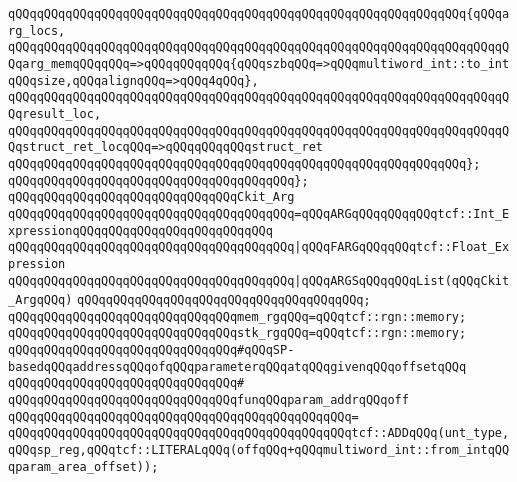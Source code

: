 \newline
\verb|qQQqqQQqqQQqqQQqqQQqqQQqqQQqqQQqqQQqqQQqqQQqqQQqqQQqqQQqqQQqqQQq{qQQqarg_locs,|\newline
\verb|qQQqqQQqqQQqqQQqqQQqqQQqqQQqqQQqqQQqqQQqqQQqqQQqqQQqqQQqqQQqqQQqqQQqqQQqarg_memqQQqqQQq=>qQQqqQQqqQQq{qQQqszbqQQq=>qQQqmultiword_int::to_intqQQqsize,qQQqalignqQQq=>qQQq4qQQq},|\newline
\newline
\verb|qQQqqQQqqQQqqQQqqQQqqQQqqQQqqQQqqQQqqQQqqQQqqQQqqQQqqQQqqQQqqQQqqQQqqQQqresult_loc,|\newline
\verb|qQQqqQQqqQQqqQQqqQQqqQQqqQQqqQQqqQQqqQQqqQQqqQQqqQQqqQQqqQQqqQQqqQQqqQQqstruct_ret_locqQQq=>qQQqqQQqqQQqstruct_ret|\newline
\verb|qQQqqQQqqQQqqQQqqQQqqQQqqQQqqQQqqQQqqQQqqQQqqQQqqQQqqQQqqQQqqQQq};|\newline
\verb|qQQqqQQqqQQqqQQqqQQqqQQqqQQqqQQqqQQqqQQq};|\newline
\newline
\verb|qQQqqQQqqQQqqQQqqQQqqQQqqQQqqQQqCkit_Arg|\newline
\verb|qQQqqQQqqQQqqQQqqQQqqQQqqQQqqQQqqQQqqQQq=qQQqARGqQQqqQQqqQQqtcf::Int_ExpressionqQQqqQQqqQQqqQQqqQQqqQQqqQQq|\newline
\verb|qQQqqQQqqQQqqQQqqQQqqQQqqQQqqQQqqQQqqQQq|\verb#|qQQqFARGqQQqqQQqtcf::Float_Expression#\newline
\verb|qQQqqQQqqQQqqQQqqQQqqQQqqQQqqQQqqQQqqQQq|\verb#|qQQqARGSqQQqqQQqList(qQQqCkit_ArgqQQq)#\newline
\verb|qQQqqQQqqQQqqQQqqQQqqQQqqQQqqQQqqQQqqQQq;|\newline
\newline
\verb|qQQqqQQqqQQqqQQqqQQqqQQqqQQqqQQqmem_rgqQQq=qQQqtcf::rgn::memory;|\newline
\verb|qQQqqQQqqQQqqQQqqQQqqQQqqQQqqQQqstk_rgqQQq=qQQqtcf::rgn::memory;|\newline
\newline
\verb|qQQqqQQqqQQqqQQqqQQqqQQqqQQqqQQq#qQQqSP-basedqQQqaddressqQQqofqQQqparameterqQQqatqQQqgivenqQQqoffsetqQQq|\newline
\verb|qQQqqQQqqQQqqQQqqQQqqQQqqQQqqQQq#|\newline
\verb|qQQqqQQqqQQqqQQqqQQqqQQqqQQqqQQqfunqQQqparam_addrqQQqoff|\newline
\verb|qQQqqQQqqQQqqQQqqQQqqQQqqQQqqQQqqQQqqQQqqQQqqQQq=|\newline
\verb|qQQqqQQqqQQqqQQqqQQqqQQqqQQqqQQqqQQqqQQqqQQqqQQqtcf::ADDqQQq(unt_type,qQQqsp_reg,qQQqtcf::LITERALqQQq(offqQQq+qQQqmultiword_int::from_intqQQqparam_area_offset));|\newline
